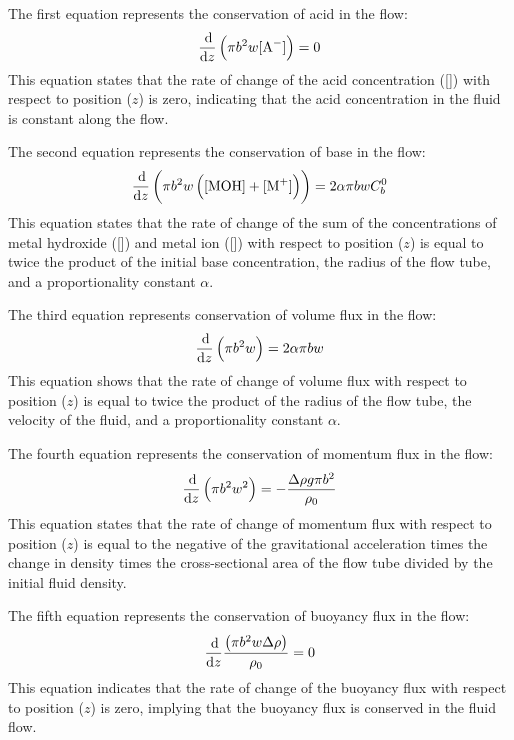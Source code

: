 The first equation represents the conservation of acid in the flow:
\begin{equation}
    \frac{\dif}{\dif z}\left(\pi b^2 w[\ce{A^-}]\right) = 0
\end{equation}
This equation states that the rate of change of the acid concentration ([]) with respect to position ($z$) is zero, indicating that the acid concentration in the fluid is constant along the flow.

The second equation represents the conservation of base in the flow:
\begin{equation}
    \frac{\dif}{\dif z}\left(\pi b^2 w \left([\ce{MOH}]+[\ce{M^+}]\right)\right) = 2\alpha \pi bwC^0_b
\end{equation}
This equation states that the rate of change of the sum of the concentrations of metal hydroxide ([]) and metal ion ([]) with respect to position ($z$) is equal to twice the product of the initial base concentration, the radius of the flow tube, and a proportionality constant $\alpha$.

The third equation represents conservation of volume flux in the flow:
\begin{equation}
    \frac{\dif}{\dif z}\left(\pi b^2 w\right) = 2\alpha \pi bw
\end{equation}
This equation shows that the rate of change of volume flux with respect to position ($z$) is equal to twice the product of the radius of the flow tube, the velocity of the fluid, and a proportionality constant $\alpha$.

The fourth equation represents the conservation of momentum flux in the flow:
\begin{equation}
    \frac{\dif}{\dif z}\left(\pi b^2 w^2\right) = -\frac{\Delta \rho g \pi b^2}{\rho_0}
\end{equation}
This equation states that the rate of change of momentum flux with respect to position ($z$) is equal to the negative of the gravitational acceleration times the change in density times the cross-sectional area of the flow tube divided by the initial fluid density.

The fifth equation represents the conservation of buoyancy flux in the flow:
\begin{equation}
    \frac{\dif}{\dif z}\frac{\left(\pi b^2 w \Delta \rho\right)}{\rho_0} = 0
\end{equation}
This equation indicates that the rate of change of the buoyancy flux with respect to position ($z$) is zero, implying that the buoyancy flux is conserved in the fluid flow.

